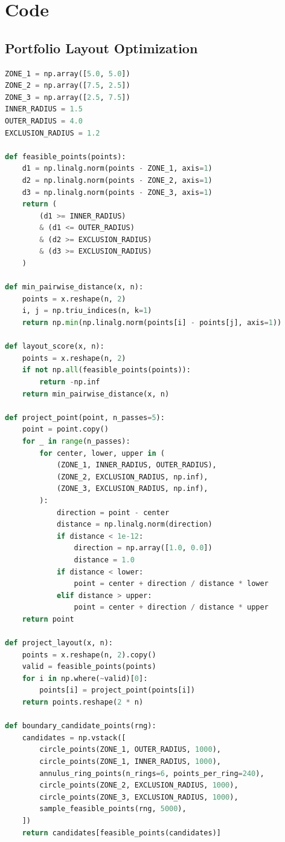 \section{Code}

\subsection{Portfolio Layout Optimization}
\label{portfolio_layout_opt}

\begin{lstlisting}[language=Python]
ZONE_1 = np.array([5.0, 5.0])
ZONE_2 = np.array([7.5, 2.5])
ZONE_3 = np.array([2.5, 7.5])
INNER_RADIUS = 1.5
OUTER_RADIUS = 4.0
EXCLUSION_RADIUS = 1.2

def feasible_points(points):
    d1 = np.linalg.norm(points - ZONE_1, axis=1)
    d2 = np.linalg.norm(points - ZONE_2, axis=1)
    d3 = np.linalg.norm(points - ZONE_3, axis=1)
    return (
        (d1 >= INNER_RADIUS)
        & (d1 <= OUTER_RADIUS)
        & (d2 >= EXCLUSION_RADIUS)
        & (d3 >= EXCLUSION_RADIUS)
    )

def min_pairwise_distance(x, n):
    points = x.reshape(n, 2)
    i, j = np.triu_indices(n, k=1)
    return np.min(np.linalg.norm(points[i] - points[j], axis=1))

def layout_score(x, n):
    points = x.reshape(n, 2)
    if not np.all(feasible_points(points)):
        return -np.inf
    return min_pairwise_distance(x, n)

def project_point(point, n_passes=5):
    point = point.copy()
    for _ in range(n_passes):
        for center, lower, upper in (
            (ZONE_1, INNER_RADIUS, OUTER_RADIUS),
            (ZONE_2, EXCLUSION_RADIUS, np.inf),
            (ZONE_3, EXCLUSION_RADIUS, np.inf),
        ):
            direction = point - center
            distance = np.linalg.norm(direction)
            if distance < 1e-12:
                direction = np.array([1.0, 0.0])
                distance = 1.0
            if distance < lower:
                point = center + direction / distance * lower
            elif distance > upper:
                point = center + direction / distance * upper
    return point

def project_layout(x, n):
    points = x.reshape(n, 2).copy()
    valid = feasible_points(points)
    for i in np.where(~valid)[0]:
        points[i] = project_point(points[i])
    return points.reshape(2 * n)

def boundary_candidate_points(rng):
    candidates = np.vstack([
        circle_points(ZONE_1, OUTER_RADIUS, 1000),
        circle_points(ZONE_1, INNER_RADIUS, 1000),
        annulus_ring_points(n_rings=6, points_per_ring=240),
        circle_points(ZONE_2, EXCLUSION_RADIUS, 1000),
        circle_points(ZONE_3, EXCLUSION_RADIUS, 1000),
        sample_feasible_points(rng, 5000),
    ])
    return candidates[feasible_points(candidates)]


\end{lstlisting}
